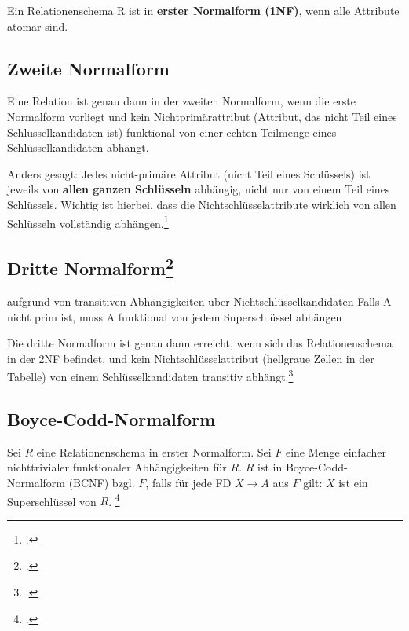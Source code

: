 \documentclass{lehramt-informatik}
\begin{document}
Ein Relationenschema R ist in \textbf{erster Normalform (1NF)}, wenn
alle Attribute atomar sind.

%

\subsection{Zweite Normalform}

Eine Relation ist genau dann in der zweiten Normalform, wenn die erste
Normalform vorliegt und kein Nichtprimärattribut (Attribut, das nicht
Teil eines Schlüsselkandidaten ist) funktional von einer echten
Teilmenge eines Schlüsselkandidaten abhängt.

Anders gesagt: Jedes nicht-primäre Attribut (nicht Teil eines
Schlüssels) ist jeweils von \textbf{allen ganzen Schlüsseln} abhängig,
nicht nur von einem Teil eines Schlüssels. Wichtig ist hierbei, dass die
Nichtschlüsselattribute wirklich von allen Schlüsseln vollständig
abhängen.\footcite[Zweite Normalform (2NF)]{wiki:normalisierung}

%

\subsection{Dritte Normalform\footcite[Seite 201]{winter}}

aufgrund von transitiven Abhängigkeiten über Nichtschlüsselkandidaten
Falls A nicht prim ist, muss A funktional von jedem Superschlüssel
abhängen

Die dritte Normalform ist genau dann erreicht, wenn sich das
Relationenschema in der 2NF befindet, und kein Nichtschlüsselattribut
(hellgraue Zellen in der Tabelle) von einem Schlüsselkandidaten
transitiv abhängt.\footcite[Dritte Normalform (3NF)]{wiki:normalisierung}

%

\subsection{Boyce-Codd-Normalform}

Sei $R$ eine Relationenschema in erster Normalform. Sei $F$ eine Menge
einfacher nichttrivialer funktionaler Abhängigkeiten für $R$. $R$ ist in
Boyce-Codd-Normalform (BCNF) bzgl. $F$, falls für jede FD $X \rightarrow
A$ aus $F$ gilt: $X$ ist ein Superschlüssel von $R$.
\footcite[Boyce-Codd-Normalform (BCNF)]{wiki:normalisierung}
\end{document}
